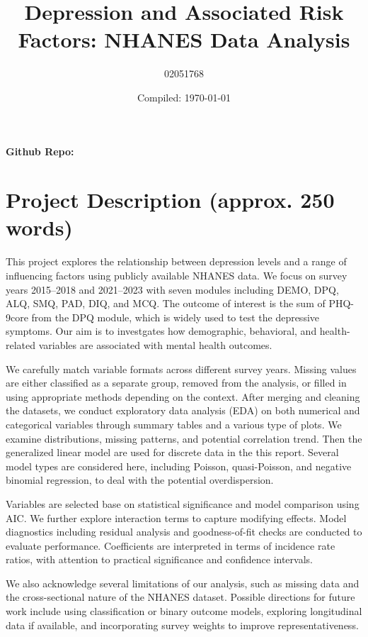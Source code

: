 \documentclass[a4paper, 12pt]{article}
\title{Depression and Associated Risk Factors: NHANES Data Analysis}
\author{02051768}
\date{Compiled: \today}
\begin{document}
\maketitle

\textbf{Github Repo:} \href{https://github.com/yichen-hazel/MATH70076-CW2/releases/tag/v1.0.0}{\color{blue}{https://github.com/yichen-hazel/MATH70076-CW2/releases/tag/v1.0.0}}

\section{Project Description (approx. 250 words)}


This project explores the relationship between depression levels and a range of influencing factors using publicly available NHANES data. We focus on survey years 2015–2018 and 2021–2023 with seven modules including DEMO, DPQ, ALQ, SMQ, PAD, DIQ, and MCQ. The outcome of interest is the sum of PHQ-9core from the DPQ module, which is widely used to test the depressive symptoms. Our aim is to investgates how demographic, behavioral, and health-related variables are associated with mental health outcomes.

We carefully match variable formats across different survey years. Missing values are either classified as a separate group, removed from the analysis, or filled in using appropriate methods depending on the context. After merging and cleaning the datasets, we conduct exploratory data analysis (EDA) on both numerical and categorical variables through summary tables and a various type of plots. We examine distributions, missing patterns, and potential correlation trend. Then the generalized linear model are used for discrete data in the this report. Several model types are considered here, including Poisson, quasi-Poisson, and negative binomial regression, to deal with the potential overdispersion.

Variables are selected base on statistical significance and model comparison using AIC. We further explore interaction terms to capture modifying effects. Model diagnostics including residual analysis and goodness-of-fit checks are conducted to evaluate performance. Coefficients are interpreted in terms of incidence rate ratios, with attention to practical significance and confidence intervals.

We also acknowledge several limitations of our analysis, such as missing data and the cross-sectional nature of the NHANES dataset. Possible directions for future work include using classification or binary outcome models, exploring longitudinal data if available, and incorporating survey weights to improve representativeness.
\end{document}
